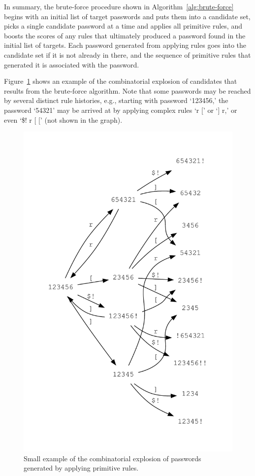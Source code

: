 \documentclass{article}
\begin{document}
In summary, the brute-force procedure shown in
Algorithm~\ref{alg:brute-force} begins with an initial list of target
passwords and puts them into a candidate set, picks a single candidate password
at a time and applies all primitive rules, and boosts the scores of any rules
that ultimately produced a password found in the initial list of targets. Each
password generated from applying rules goes into the candidate set if it is not
already in there, and the sequence of primitive rules that generated it is
associated with the password.

Figure~\ref{fig:pwgen} shows an example of the combinatorial explosion of
candidates that results from the brute-force algorithm. Note that some
passwords may be reached by several distinct rule histories, e.g., starting with
password `123456,' the password `54321' may be arrived at by applying complex
rules `r [' or `] r,' or even `\$! r [ [' (not shown in the graph).

\begin{figure}[ht!]
\centering
\includegraphics[width=0.7\linewidth]{figures/example-pw-rules.pdf}
\caption{Small example of the combinatorial explosion of passwords generated by
applying primitive rules.}
\label{fig:pwgen}
\end{figure}
\end{document}
